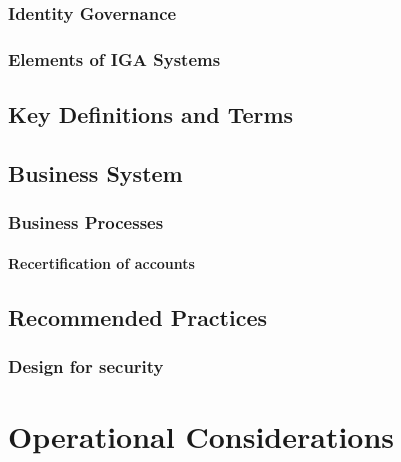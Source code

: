 \hypertarget{identity-governance}{%
\subsection{\texorpdfstring{Identity Governance
}{Identity Governance }}\label{identity-governance}}

\hypertarget{elements-of-iga-systems}{%
\subsection{\texorpdfstring{Elements of IGA Systems
}{Elements of IGA Systems }}\label{elements-of-iga-systems}}

\hypertarget{key-definitions-and-terms}{%
\section{\texorpdfstring{Key Definitions and Terms
}{Key Definitions and Terms }}\label{key-definitions-and-terms}}

\hypertarget{business-system}{%
\section{Business System}\label{business-system}}

\hypertarget{business-processes}{%
\subsection{Business Processes}\label{business-processes}}

\hypertarget{recertification-of-accounts}{%
\subsubsection{Recertification of
accounts}\label{recertification-of-accounts}}

\hypertarget{recommended-practices}{%
\section{Recommended Practices}\label{recommended-practices}}

\hypertarget{design-for-security}{%
\subsection{Design for security}\label{design-for-security}}

\hypertarget{operational-considerations}{%
\chapter{Operational Considerations}\label{operational-considerations}}

